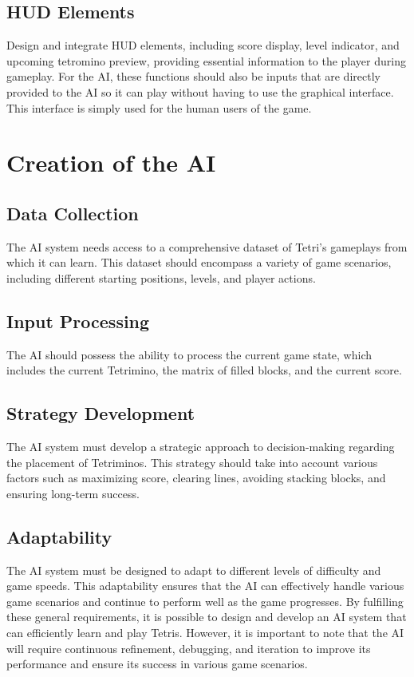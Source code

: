 \documentclass[conference]{IEEEtran}
\begin{document}
\subsection{HUD Elements}
Design and integrate HUD elements, including score display, level indicator, and upcoming tetromino preview, providing essential information to the player during gameplay. For the AI, these functions should also be inputs that are directly provided to the AI so it can play without having to use the graphical interface. This interface is simply used for the human users of the game.

\section*{Creation of the AI}
\subsection{Data Collection}
The AI system needs access to a comprehensive dataset of Tetri's gameplays from which it can learn. This dataset should encompass a variety of game scenarios, including different starting positions, levels, and player actions.
\subsection{Input Processing}
The AI should possess the ability to process the current game state, which includes the current Tetrimino, the matrix of filled blocks, and the current score.
\subsection{Strategy Development}
The AI system must develop a strategic approach to decision-making regarding the placement of Tetriminos. This strategy should take into account various factors such as maximizing score, clearing lines, avoiding stacking blocks, and ensuring long-term success.
\subsection{Adaptability}
The AI system must be designed to adapt to different levels of difficulty and game speeds. This adaptability ensures that the AI can effectively handle various game scenarios and continue to perform well as the game progresses.
\newline
\newline
By fulfilling these general requirements, it is possible to design and develop an AI system that can efficiently learn and play Tetris. However, it is important to note that the AI will require continuous refinement, debugging, and iteration to improve its performance and ensure its success in various game scenarios.
\end{document}
